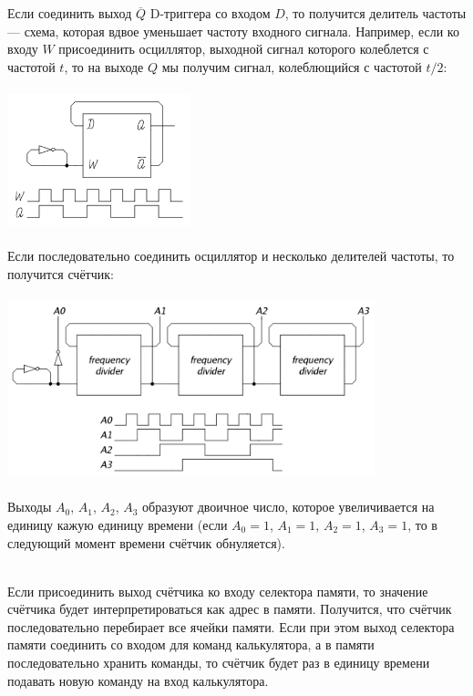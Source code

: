 \documentclass[11pt]{book}
\begin{document}
\\ \\
Если соединить выход $\overline{Q}$ D-триггера со входом $D$, то получится делитель частоты ---
схема, которая вдвое уменьшает частоту входного сигнала.
Например, если ко входу $W$ присоединить осциллятор, выходной сигнал которого колеблется с частотой $t$,
то на выходе $Q$ мы получим сигнал, колеблющийся с частотой $t/2$:
\\ \\
\includegraphics[height=1.5in]{pic/frequency_divider.png}
\\ \\
Если последовательно соединить осциллятор и несколько делителей частоты, то получится счётчик:
\\ \\
\includegraphics[height=2in]{pic/counter.png}
\\ \\
Выходы $A_0$, $A_1$, $A_2$, $A_3$ образуют двоичное число, которое увеличивается на единицу кажую единицу времени
(если $A_0=1$, $A_1=1$, $A_2=1$, $A_3=1$, то в следующий момент времени счётчик обнуляется).
\\ \\
\begin{minipage}{0.6\textwidth}
Если присоединить выход счётчика ко входу селектора памяти,
то значение счётчика будет интерпретироваться как адрес в памяти.
Получится, что счётчик последовательно перебирает все ячейки памяти.
Если при этом выход селектора памяти соединить со входом для команд калькулятора,
а в памяти последовательно хранить команды,
то счётчик будет раз в единицу времени подавать новую команду на вход калькулятора.
\end{minipage}
\end{document}
